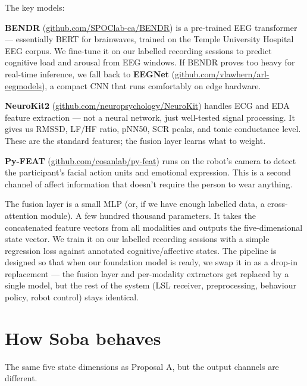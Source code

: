 \documentclass[11pt,a4paper]{article}
\begin{document}
The key models:

\textbf{BENDR} (\href{https://github.com/SPOClab-ca/BENDR}{github.com/SPOClab-ca/BENDR}) is a pre-trained EEG transformer --- essentially BERT for brainwaves, trained on the Temple University Hospital EEG corpus. We fine-tune it on our labelled recording sessions to predict cognitive load and arousal from EEG windows. If BENDR proves too heavy for real-time inference, we fall back to \textbf{EEGNet} (\href{https://github.com/vlawhern/arl-eegmodels}{github.com/vlawhern/arl-eegmodels}), a compact CNN that runs comfortably on edge hardware.

\textbf{NeuroKit2} (\href{https://github.com/neuropsychology/NeuroKit}{github.com/neuropsychology/NeuroKit}) handles ECG and EDA feature extraction --- not a neural network, just well-tested signal processing. It gives us RMSSD, LF/HF ratio, pNN50, SCR peaks, and tonic conductance level. These are the standard features; the fusion layer learns what to weight.

\textbf{Py-FEAT} (\href{https://github.com/cosanlab/py-feat}{github.com/cosanlab/py-feat}) runs on the robot's camera to detect the participant's facial action units and emotional expression. This is a second channel of affect information that doesn't require the person to wear anything.

The fusion layer is a small MLP (or, if we have enough labelled data, a cross-attention module). A few hundred thousand parameters. It takes the concatenated feature vectors from all modalities and outputs the five-dimensional state vector. We train it on our labelled recording sessions with a simple regression loss against annotated cognitive/affective states. The pipeline is designed so that when our foundation model is ready, we swap it in as a drop-in replacement --- the fusion layer and per-modality extractors get replaced by a single model, but the rest of the system (LSL receiver, preprocessing, behaviour policy, robot control) stays identical.

\section{How Soba behaves}

The same five state dimensions as Proposal A, but the output channels are different.
\end{document}
